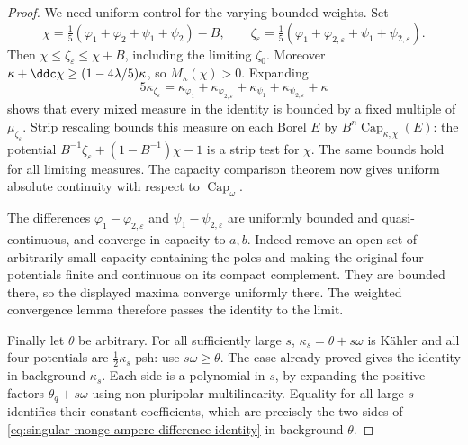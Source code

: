 \begin{proof}
We need uniform control for the varying bounded weights. Set
\[
 \chi=\tfrac15(\varphi_1+\varphi_2+\psi_1+\psi_2)-B,
 \qquad
 \zeta_\varepsilon=\tfrac15
              (\varphi_1+\varphi_{2,\varepsilon}+\psi_1+\psi_{2,\varepsilon}).
\]
Then $\chi\leq\zeta_\varepsilon\leq\chi+B$, including the limiting $\zeta_0$. Moreover
$\kappa+\ddc\chi\geq(1-4\lambda/5)\kappa$, so $M_\kappa(\chi)>0$. Expanding
\[
 5\kappa_{\zeta_\varepsilon}
    =\kappa_{\varphi_1}+\kappa_{\varphi_{2,\varepsilon}}
                        +\kappa_{\psi_1}+\kappa_{\psi_{2,\varepsilon}}+\kappa
\]
shows that every mixed measure in the identity is bounded by a fixed multiple of $\mu_{\zeta_\varepsilon}$. Strip rescaling bounds this measure on each Borel $E$ by
$B^n\operatorname{Cap}_{\kappa,\chi}(E)$: the potential
$B^{-1}\zeta_\varepsilon+(1-B^{-1})\chi-1$ is a strip test for $\chi$.
The same bounds hold for all limiting measures. The capacity comparison theorem now gives uniform absolute continuity with respect to $\operatorname{Cap}_\omega$.

The differences $\varphi_1-\varphi_{2,\varepsilon}$ and $\psi_1-\psi_{2,\varepsilon}$ are uniformly bounded and quasi-continuous, and converge in capacity to $a,b$. Indeed remove an open set of arbitrarily small capacity containing the poles and making the original four potentials finite and continuous on its compact complement. They are bounded there, so the displayed maxima converge uniformly there. The weighted convergence lemma therefore passes the identity to the limit.

Finally let $\theta$ be arbitrary. For all sufficiently large $s$, $\kappa_s=\theta+s\omega$ is K\"ahler and all four potentials are $\tfrac12\kappa_s$-psh: use $s\omega\geq\theta$. The case already proved gives the identity in background $\kappa_s$. Each side is a polynomial in $s$, by expanding the positive factors $\theta_q+s\omega$ using non-pluripolar multilinearity. Equality for all large $s$ identifies their constant coefficients, which are precisely the two sides of \eqref{eq:singular-monge-ampere-difference-identity} in background $\theta$.
\end{proof}

